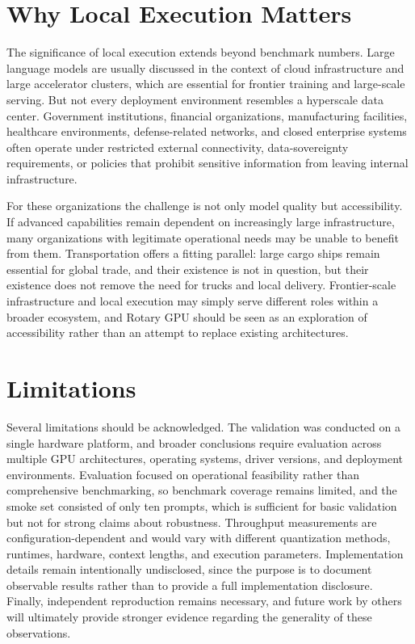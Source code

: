 \documentclass[11pt]{article}
\begin{document}
\section{Why Local Execution Matters}

The significance of local execution extends beyond benchmark numbers. Large language models are usually discussed in the context of cloud infrastructure and large accelerator clusters, which are essential for frontier training and large-scale serving. But not every deployment environment resembles a hyperscale data center. Government institutions, financial organizations, manufacturing facilities, healthcare environments, defense-related networks, and closed enterprise systems often operate under restricted external connectivity, data-sovereignty requirements, or policies that prohibit sensitive information from leaving internal infrastructure.

For these organizations the challenge is not only model quality but accessibility. If advanced capabilities remain dependent on increasingly large infrastructure, many organizations with legitimate operational needs may be unable to benefit from them. Transportation offers a fitting parallel: large cargo ships remain essential for global trade, and their existence is not in question, but their existence does not remove the need for trucks and local delivery. Frontier-scale infrastructure and local execution may simply serve different roles within a broader ecosystem, and Rotary GPU should be seen as an exploration of accessibility rather than an attempt to replace existing architectures.

\section{Limitations}

Several limitations should be acknowledged. The validation was conducted on a single hardware platform, and broader conclusions require evaluation across multiple GPU architectures, operating systems, driver versions, and deployment environments. Evaluation focused on operational feasibility rather than comprehensive benchmarking, so benchmark coverage remains limited, and the smoke set consisted of only ten prompts, which is sufficient for basic validation but not for strong claims about robustness. Throughput measurements are configuration-dependent and would vary with different quantization methods, runtimes, hardware, context lengths, and execution parameters. Implementation details remain intentionally undisclosed, since the purpose is to document observable results rather than to provide a full implementation disclosure. Finally, independent reproduction remains necessary, and future work by others will ultimately provide stronger evidence regarding the generality of these observations.
\end{document}
